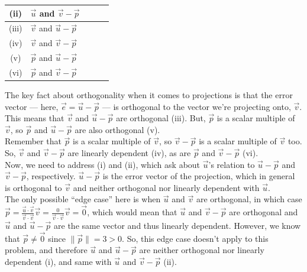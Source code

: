 \documentclass[11pt]{article}
\begin{document}
\begin{prob}[(12 pts)]
\begin{subprob}
\begin{tabular}{|c|l|c|c|c|}
(ii) & $\vec u$ and $\vec v - \vec p$        & \bubble{} & \bubble{} & \correctbubble{} \\
\hline
\rule{0pt}{2.5ex}

(iii) & $\vec v$ and $\vec u - \vec p$        & \correctbubble{} & \bubble{} & \bubble{} \\
\hline
\rule{0pt}{2.5ex}

(iv) & $\vec v$ and $\vec v - \vec p$        & \bubble{} & \correctbubble{} & \bubble{} \\
\hline
\rule{0pt}{2.5ex}

(v) & $\vec p$ and $\vec u - \vec p$        & \correctbubble{} & \bubble{} & \bubble{} \\
\hline
\rule{0pt}{2.5ex}

(vi) & $\vec p$ and $\vec v - \vec p$        & \bubble{} & \correctbubble{} & \bubble{} \\
\hline
\end{tabular}

\begin{solution}
The key fact about orthogonality when it comes to projections is that the error vector --- here, $\vec e = \vec u - \vec p$ --- is orthogonal to the vector we're projecting onto, $\vec v$. \\

This means that $\vec v$ and $\vec u - \vec p$ are orthogonal (iii). But, $\vec p$ is a scalar multiple of $\vec v$, so $\vec p$ and $\vec u - \vec p$ are also orthogonal (v). \\

Remember that $\vec p$ is a scalar multiple of $\vec v$, so $\vec v - \vec p$ is a scalar multiple of $\vec v$ too. So, $\vec v$ and $\vec v - \vec p$ are linearly dependent (iv), as are $\vec p$ and $\vec v - \vec p$ (vi). \\

Now, we need to address (i) and (ii), which ask about $\vec u$'s relation to $\vec u - \vec p$ and $\vec v - \vec p$, respectively. $\vec u - \vec p$ is the error vector of the projection, which in general is orthogonal to $\vec v$ and neither orthogonal nor linearly dependent with $\vec u$. \\ 

The only possible ``edge case'' here is when $\vec u$ and $\vec v$ are orthogonal, in which case $\vec p = \frac{\vec u \cdot \vec v}{\vec v \cdot \vec v} \vec v = \frac{0}{\vec v \cdot \vec v} \vec v = \vec 0$, which would mean that $\vec u$ and $\vec v - \vec p$ are orthogonal and $\vec u$ and $\vec u - \vec p$ are the same vector and thus linearly dependent. However, we know that $\vec p \neq \vec 0$ since $\lVert \vec p \rVert = 3 > 0$. So, this edge case doesn't apply to this problem, and therefore $\vec u$ and $\vec u - \vec p$ are neither orthogonal nor linearly dependent (i), and same with $\vec u$ and $\vec v - \vec p$ (ii).

\end{solution}

\end{subprob}

\end{prob}
\end{document}
